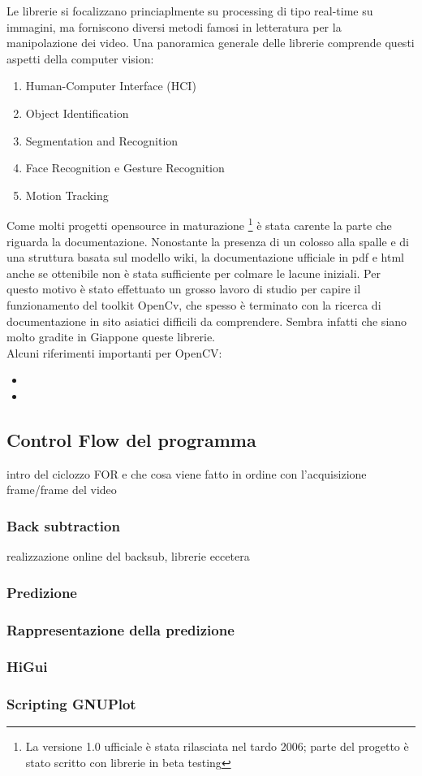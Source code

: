 Le librerie si focalizzano princiaplmente su processing di tipo real-time su immagini, ma forniscono diversi metodi famosi in letteratura per la manipolazione dei video. Una panoramica generale delle librerie comprende questi aspetti della computer vision:
\begin{enumerate}
\item Human-Computer Interface (HCI)
\item Object Identification
\item Segmentation and Recognition
\item Face Recognition e Gesture Recognition
\item Motion Tracking
\end{enumerate}

Come molti progetti opensource in maturazione \footnote{La versione 1.0 ufficiale è stata rilasciata nel tardo 2006; parte del progetto è stato scritto con librerie in beta testing} è stata carente la parte che riguarda la documentazione. Nonostante la presenza di un colosso alla spalle e di una struttura basata sul modello wiki, la documentazione ufficiale in pdf e html anche se ottenibile non è stata sufficiente per colmare le lacune iniziali. Per questo motivo è stato effettuato un grosso lavoro di studio per capire il funzionamento del toolkit OpenCv, che spesso è terminato con la ricerca di documentazione in sito asiatici difficili da comprendere. Sembra infatti che siano molto gradite in Giappone queste librerie.\\
Alcuni riferimenti importanti per OpenCV:
\begin{itemize}
 \item {}
\item {}
\end{itemize}

 
\subsection{Control Flow del programma}
intro del ciclozzo FOR e che cosa viene fatto in ordine con l'acquisizione frame/frame del video

\subsubsection{Back subtraction}
realizzazione online del backsub, librerie eccetera
\subsubsection{Predizione}
\subsubsection{Rappresentazione della predizione}
\subsubsection{HiGui}
\subsubsection{Scripting GNUPlot}

